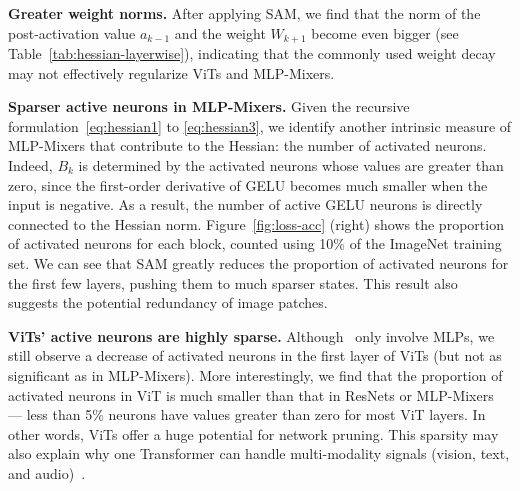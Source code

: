 \documentclass{article}
\begin{document}
\textbf{Greater weight norms.} After applying SAM, we find that the norm of the post-activation value $a_{k-1}$ and the weight $W_{k+1}$ become even bigger (see Table~\ref{tab:hessian-layerwise}), indicating that the commonly used weight decay may not effectively regularize ViTs and MLP-Mixers.

\textbf{Sparser active neurons in MLP-Mixers.} 
Given the recursive formulation~\eqref{eq:hessian1} to \eqref{eq:hessian3}, we identify another intrinsic measure of MLP-Mixers that contribute to the Hessian: the number of activated neurons. Indeed, $B_k$ is determined by the activated neurons whose values are greater than zero, since the first-order derivative of GELU becomes much smaller when the input is negative. 
As a result, the number of active GELU neurons is directly connected to the Hessian norm.
Figure~\ref{fig:loss-acc} (right) shows the proportion of activated neurons for each block, counted using 10\% of the ImageNet training set.
We can see that SAM greatly reduces the proportion of activated neurons for the first few layers, pushing them to much sparser states.
This result also suggests the potential redundancy of image patches.

\textbf{ViTs' active neurons are highly sparse.}
Although~ only involve MLPs, we still observe a decrease of activated neurons in the first layer of ViTs (but not as significant as in MLP-Mixers).
More interestingly, we find that the proportion of activated neurons in ViT is much smaller than that in ResNets or MLP-Mixers --- less than 5\% neurons have values greater than zero for most ViT layers. In other words, ViTs offer a huge potential for network pruning. This sparsity may also  explain why one Transformer can handle multi-modality signals (vision, text, and audio)~\cite{akbari2021vatt}.  %
\end{document}
